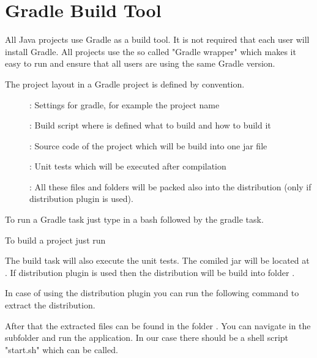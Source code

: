 \documentclass[a4paper]{doipdoc}
\begin{document}
		

\section{Gradle Build Tool}

	All Java projects use Gradle as a build tool. It is not required that
	each user will install Gradle. All projects use the so called 
	"Gradle wrapper" which makes it easy to run and ensure that all users
	are using the same Gradle version.

	The project layout in a Gradle project is defined by convention.

	\begin{description}

		\item[]: Settings for gradle, for example
		the project name

		\item[]: Build script where is defined what
		to build and how to build it

		\item[]: Source code of the project which will
		be build into one jar file

		\item[]: Unit tests which will be executed after
		compilation
		
		\item[]: All these files and folders will be packed 
		also into the distribution (only if distribution plugin is used).

	\end{description}

	To run a Gradle task just type  in a bash
	followed by the gradle task.

	To build a project just run 


	The build task will also execute the unit tests. The comiled jar will be 
	located at . If distribution plugin is used then the 
	distribution will be build into folder .

	In case of using the distribution plugin you can run the following command
	to extract the distribution.


	After that the extracted files can be found in the folder 
	. You can navigate in the subfolder and run the
	application. In our case there should be a shell script "start.sh" 
	which can be called.
\end{document}

